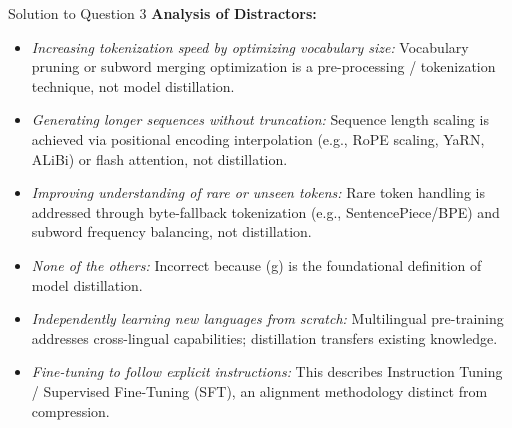 \documentclass[11pt,a4paper]{article}
\begin{document}
\begin{solutionbox}{Solution to Question 3}
\medskip
\textbf{Analysis of Distractors:}
\begin{itemize}[leftmargin=1.5cm]
    \item[\textbf{(a)}] \textit{Increasing tokenization speed by optimizing vocabulary size:} Vocabulary pruning or subword merging optimization is a pre-processing / tokenization technique, not model distillation.
    \item[\textbf{(b)}] \textit{Generating longer sequences without truncation:} Sequence length scaling is achieved via positional encoding interpolation (e.g., RoPE scaling, YaRN, ALiBi) or flash attention, not distillation.
    \item[\textbf{(c)}] \textit{Improving understanding of rare or unseen tokens:} Rare token handling is addressed through byte-fallback tokenization (e.g., SentencePiece/BPE) and subword frequency balancing, not distillation.
    \item[\textbf{(d)}] \textit{None of the others:} Incorrect because (g) is the foundational definition of model distillation.
    \item[\textbf{(e)}] \textit{Independently learning new languages from scratch:} Multilingual pre-training addresses cross-lingual capabilities; distillation transfers existing knowledge.
    \item[\textbf{(f)}] \textit{Fine-tuning to follow explicit instructions:} This describes Instruction Tuning / Supervised Fine-Tuning (SFT), an alignment methodology distinct from compression.
\end{itemize}
\end{solutionbox}

\bigskip
\end{document}
